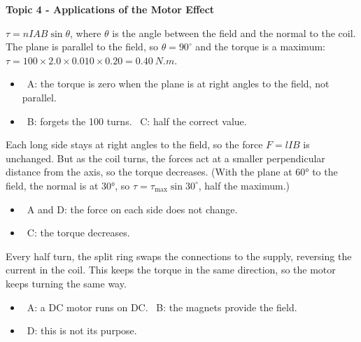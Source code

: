 \documentclass[12pt]{article}
\newcommand\anstopic[1]{\par\Needspace{8\baselineskip}\vspace{4mm}%
  \begin{center}{\headfont\bfseries\fontsize{14}{18}\selectfont #1\par}\end{center}\vspace{2pt}}
\begin{document}
\begin{practiceanswers}
\anstopic{Topic 4 - Applications of the Motor Effect}

\begin{practiceans}
  $\tau = nIAB\sin\theta$, where $\theta$ is the angle between the field and the normal to the coil. The
  plane is parallel to the field, so $\theta = 90^\circ$ and the torque is a maximum:
  $\tau = 100 \times 2.0 \times 0.010 \times 0.20 = \qty{0.40}{N.m}$.
  \begin{itemize}
    \item \xmark\ A: the torque is zero when the plane is at right angles to the field, not parallel.
    \item \xmark\ B: forgets the 100 turns. \quad \xmark\ C: half the correct value.
  \end{itemize}
\end{practiceans}

\begin{practiceans}
  Each long side stays at right angles to the field, so the force $F = lIB$ is unchanged. But as the coil
  turns, the forces act at a smaller perpendicular distance from the axis, so the torque decreases. (With
  the plane at \ang{60} to the field, the normal is at \ang{30}, so $\tau = \tau_\mathrm{max}\sin 30^\circ$,
  half the maximum.)
  \begin{itemize}
    \item \xmark\ A and D: the force on each side does not change.
    \item \xmark\ C: the torque decreases.
  \end{itemize}
\end{practiceans}

\begin{practiceans}
  Every half turn, the split ring swaps the connections to the supply, reversing the current in the
  coil. This keeps the torque in the same direction, so the motor keeps turning the same way.
  \begin{itemize}
    \item \xmark\ A: a DC motor runs on DC. \quad \xmark\ B: the magnets provide the field.
    \item \xmark\ D: this is not its purpose.
  \end{itemize}
\end{practiceans}


\end{practiceanswers}
\end{document}
